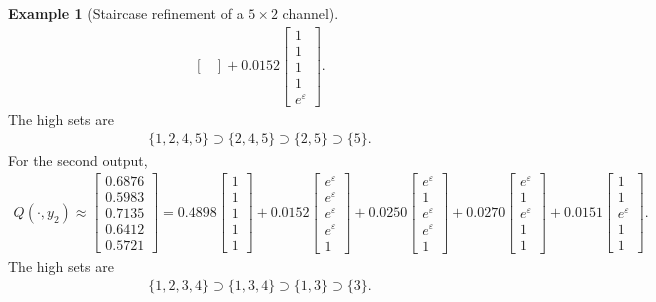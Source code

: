 \documentclass{article}
\theoremstyle{plain}
\theoremstyle{definition}
\newtheorem{example}[theorem]{Example}
\theoremstyle{plain}
\newcommand{\eps}{\varepsilon}
\begin{document}
\begin{example}[Staircase refinement of a $5\times 2$ channel]
\begin{align*}
\begin{bmatrix}
    \end{bmatrix}
    +
    0.0152
    \begin{bmatrix}
    1\\ 1\\ 1\\ 1\\ e^\eps
    \end{bmatrix}.
\end{align*}
The high sets are
\begin{align*}
    \{1,2,4,5\}\supset \{2,4,5\}\supset \{2,5\}\supset \{5\}.
\end{align*}
For the second output,
\begin{align*}
    Q(\cdot,y_2)
    \approx
    \begin{bmatrix}
    0.6876\\
    0.5983\\
    0.7135\\
    0.6412\\
    0.5721
    \end{bmatrix}
    =
    0.4898
    \begin{bmatrix}
    1\\1\\1\\1\\1
    \end{bmatrix}
    +
    0.0152
    \begin{bmatrix}
    e^\eps\\ e^\eps\\ e^\eps\\ e^\eps\\ 1
    \end{bmatrix}
    +
    0.0250
    \begin{bmatrix}
    e^\eps\\ 1\\ e^\eps\\ e^\eps\\ 1
    \end{bmatrix}
    +
    0.0270
    \begin{bmatrix}
    e^\eps\\ 1\\ e^\eps\\ 1\\ 1
    \end{bmatrix}
    +
    0.0151
    \begin{bmatrix}
    1\\ 1\\ e^\eps\\ 1\\ 1
    \end{bmatrix}.
\end{align*}
The high sets are
\begin{align*}
    \{1,2,3,4\}\supset \{1,3,4\}\supset \{1,3\}\supset \{3\}.
\end{align*}

\end{example}
\end{document}
